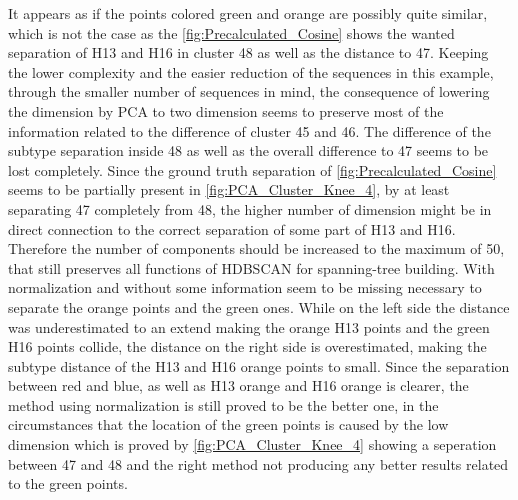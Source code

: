 It appears as if the points colored green and orange are possibly quite similar, which is not the case as the \autoref{fig:Precalculated_Cosine} shows the wanted separation of H13 and H16 in cluster 48 as well as the distance to 47. Keeping the lower complexity and the easier reduction of the sequences in this example, through the smaller number of sequences in mind, the consequence of lowering the dimension by \gls{PCA} to two dimension seems to preserve most of the information related to the difference of cluster 45 and 46. The difference of the subtype separation inside 48 as well as the overall difference to 47 seems to be lost completely. Since the ground truth separation of \autoref{fig:Precalculated_Cosine} seems to be partially present in \autoref{fig:PCA_Cluster_Knee_4}, by at least separating 47 completely from 48, the higher number of dimension might be in direct connection to the correct separation of some part of H13 and H16. Therefore the number of components should be increased to the maximum of 50, that still preserves all functions of \gls{HDBSCAN} for spanning-tree building. With normalization and without some information seem to be missing necessary to separate the orange points and the green ones. While on the left side the distance was underestimated to an extend making the orange H13 points and the green H16 points collide, the distance on the right side is overestimated, making the subtype distance of the H13 and H16 orange points to small. Since the separation between red and blue, as well as H13 orange and H16 orange is clearer, the method using normalization is still proved to be the better one, in the circumstances that the location of the green points is caused by the low dimension which is proved by \autoref{fig:PCA_Cluster_Knee_4} showing a seperation between 47 and 48 and the right method not producing any better results related to the green points. 

